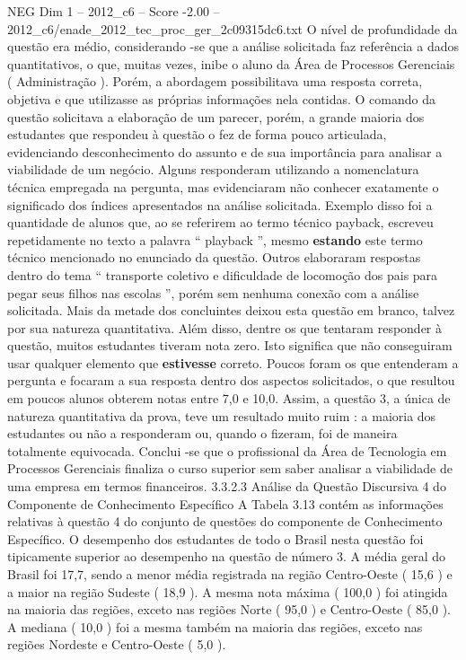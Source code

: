 \begin{textsample}{NEG Dim 1 – 2012\_c6 – Score -2.00 – 2012\_c6/enade\_2012\_tec\_proc\_ger\_2c09315dc6.txt}
O nível de profundidade da questão era médio, considerando -se que a análise solicitada faz referência a dados quantitativos, o que, muitas vezes, inibe o aluno da Área de Processos Gerenciais ( Administração ).
Porém, a abordagem possibilitava uma resposta correta, objetiva e que utilizasse as próprias informações nela contidas.
O comando da questão solicitava a elaboração de um parecer, porém, a grande maioria dos estudantes que respondeu à questão o fez de forma pouco articulada, evidenciando desconhecimento do assunto e de sua importância para analisar a viabilidade de um negócio.
Alguns responderam utilizando a nomenclatura técnica empregada na pergunta, mas evidenciaram não conhecer exatamente o significado dos índices apresentados na análise solicitada.
Exemplo disso foi a quantidade de alunos que, ao se referirem ao termo técnico payback, escreveu repetidamente no texto a palavra “ playback ”, mesmo \textbf{estando} este termo técnico mencionado no enunciado da questão.
Outros elaboraram respostas dentro do tema “ transporte coletivo e dificuldade de locomoção dos pais para pegar seus filhos nas escolas ”, porém sem nenhuma conexão com a análise solicitada.
Mais da metade dos concluintes deixou esta questão em branco, talvez por sua natureza quantitativa.
Além disso, dentre os que tentaram responder à questão, muitos estudantes tiveram nota zero.
Isto significa que não conseguiram usar qualquer elemento que \textbf{estivesse} correto.
Poucos foram os que entenderam a pergunta e focaram a sua resposta dentro dos aspectos solicitados, o que resultou em poucos alunos obterem notas entre 7,0 e 10,0.
Assim, a questão 3, a única de natureza quantitativa da prova, teve um resultado muito ruim : a maioria dos estudantes ou não a responderam ou, quando o fizeram, foi de maneira totalmente equivocada.
Conclui -se que o profissional da Área de Tecnologia em Processos Gerenciais finaliza o curso superior sem saber analisar a viabilidade de uma empresa em termos financeiros. 3.3.2.3 Análise da Questão Discursiva 4 do Componente de Conhecimento Específico A Tabela 3.13 contém as informações relativas à questão 4 do conjunto de questões do componente de Conhecimento Específico.
O desempenho dos estudantes de todo o Brasil nesta questão foi tipicamente superior ao desempenho na questão de número 3.
A média geral do Brasil foi 17,7, sendo a menor média registrada na região Centro-Oeste ( 15,6 ) e a maior na região Sudeste ( 18,9 ).
A mesma nota máxima ( 100,0 ) foi atingida na maioria das regiões, exceto nas regiões Norte ( 95,0 ) e Centro-Oeste ( 85,0 ).
A mediana ( 10,0 ) foi a mesma também na maioria das regiões, exceto nas regiões Nordeste e Centro-Oeste ( 5,0 ).

\end{textsample}
